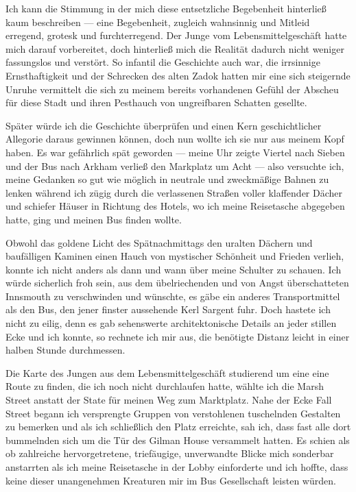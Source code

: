 Ich kann die Stimmung in der mich diese entsetzliche Begebenheit hinterließ kaum beschreiben --- eine Begebenheit, zugleich wahnsinnig und Mitleid erregend, grotesk und furchterregend. Der Junge vom Lebensmittelgeschäft hatte mich darauf vorbereitet, doch hinterließ mich die Realität dadurch nicht weniger fassungslos und verstört. So infantil die Geschichte auch war, die irrsinnige Ernsthaftigkeit und der Schrecken des alten Zadok hatten mir eine sich steigernde Unruhe vermittelt die sich zu meinem bereits vorhandenen Gefühl der Abscheu für diese Stadt und ihren Pesthauch von ungreifbaren Schatten gesellte.

Später würde ich die Geschichte überprüfen und einen Kern geschichtlicher Allegorie daraus gewinnen können, doch nun wollte ich sie nur aus meinem Kopf haben. Es war gefährlich spät geworden --- meine Uhr zeigte Viertel nach Sieben und der Bus nach Arkham verließ den Markplatz um Acht --- also versuchte ich, meine Gedanken so gut wie möglich in neutrale und zweckmäßige Bahnen zu lenken während ich zügig durch die verlassenen Straßen voller klaffender Dächer und schiefer Häuser in Richtung des Hotels, wo ich meine Reisetasche abgegeben hatte, ging und meinen Bus finden wollte.

Obwohl das goldene Licht des Spätnachmittags den uralten Dächern und baufälligen Kaminen einen Hauch von mystischer Schönheit und Frieden verlieh, konnte ich nicht anders als dann und wann über meine Schulter zu schauen. Ich würde sicherlich froh sein, aus dem übelriechenden und von Angst überschatteten Innsmouth zu verschwinden und wünschte, es gäbe ein anderes Transportmittel als den Bus, den jener finster aussehende Kerl Sargent fuhr. Doch hastete ich nicht zu eilig, denn es gab sehenswerte architektonische Details an jeder stillen Ecke und ich konnte, so rechnete ich mir aus, die benötigte Distanz leicht in einer halben Stunde durchmessen.

Die Karte des Jungen aus dem Lebensmittelgeschäft studierend um eine eine Route zu finden, die ich noch nicht durchlaufen hatte, wählte ich die Marsh Street anstatt der State für meinen Weg zum Marktplatz. Nahe der Ecke Fall Street begann ich versprengte Gruppen von verstohlenen tuschelnden Gestalten zu bemerken und als ich schließlich den Platz erreichte, sah ich, dass fast alle dort bummelnden sich um die Tür des Gilman House versammelt hatten. Es schien als ob zahlreiche hervorgetretene, triefäugige, unverwandte Blicke mich sonderbar anstarrten als ich meine Reisetasche in der Lobby einforderte und ich hoffte, dass keine dieser unangenehmen Kreaturen mir im Bus Gesellschaft leisten würden.

